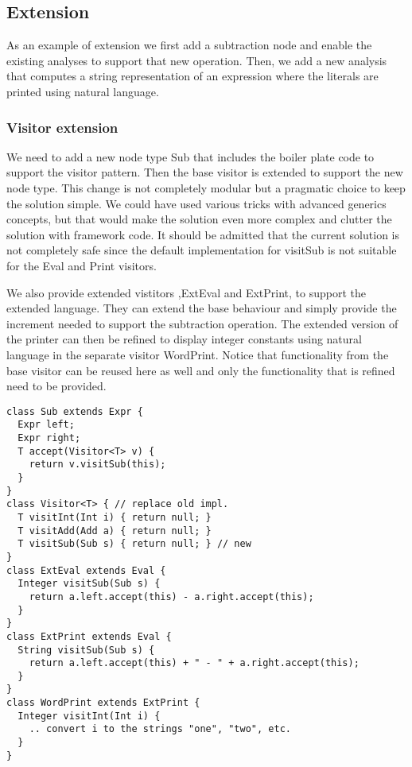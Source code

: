 \subsection{Extension}
As an example of extension we first add a subtraction node and enable the
existing analyses to support that new operation. Then, we add a new
analysis that computes a string representation of an expression where the
literals are printed using natural language.

\subsubsection{Visitor extension}
We need to add a new node type Sub that includes the boiler plate code to
support the visitor pattern. Then the base visitor is extended to support
the new node type. This change is not completely modular but a pragmatic
choice to keep the solution simple. We could have used various tricks with advanced
generics concepts, but that would make the solution even more complex and 
clutter the solution with framework code. It should be admitted that the 
current solution is not
completely safe since the default implementation for visitSub is not
suitable for the Eval and Print visitors. 

We also provide extended vistitors
,ExtEval and ExtPrint, to support the extended language.
They can extend the base behaviour and simply provide the increment
needed to support the subtraction operation. The extended version of the
printer can then be refined to display integer constants using natural
language in the separate visitor WordPrint. Notice that functionality from
the base visitor can be reused here as well and only the functionality 
that is refined need to be provided.

\begin{lstlisting}[caption={Visitor Extension}]
class Sub extends Expr {
  Expr left;
  Expr right;
  T accept(Visitor<T> v) {
    return v.visitSub(this);
  }
}
class Visitor<T> { // replace old impl.
  T visitInt(Int i) { return null; }
  T visitAdd(Add a) { return null; }
  T visitSub(Sub s) { return null; } // new
}
class ExtEval extends Eval {
  Integer visitSub(Sub s) {
    return a.left.accept(this) - a.right.accept(this);
  }
}
class ExtPrint extends Eval {
  String visitSub(Sub s) {
    return a.left.accept(this) + " - " + a.right.accept(this);
  }
}
class WordPrint extends ExtPrint {
  Integer visitInt(Int i) {
    .. convert i to the strings "one", "two", etc.
  }
}
\end{lstlisting}

